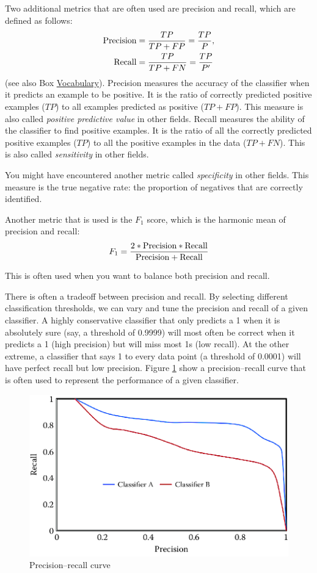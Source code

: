 \documentclass[]{krantz}
\begin{document}
Two additional metrics that are often used are precision and recall,
which are defined as follows: \[\begin{aligned}
{\rm Precision} &= \frac{TP}{TP + FP}=\frac{TP}{P},
\\
{\rm Recall} &= \frac{TP}{TP + FN}=\frac{TP}{P'}
\end{aligned}\] (see also Box \protect\hyperlink{box:ml3}{Vocabulary}).
Precision measures the accuracy of the classifier when it predicts an
example to be positive. It is the ratio of correctly predicted positive
examples (\(TP\)) to all examples predicted as positive (\(TP + FP\)).
This measure is also called \emph{positive predictive value} in other
fields. Recall measures the ability of the classifier to find positive
examples. It is the ratio of all the correctly predicted positive
examples (\(TP\)) to all the positive examples in the data
(\(TP + FN\)). This is also called \emph{sensitivity} in other fields.

You might have encountered another metric called \emph{specificity} in
other fields. This measure is the true negative rate: the proportion of
negatives that are correctly identified.

Another metric that is used is the \(F_1\) score, which is the harmonic
mean of precision and recall:
\[F_1 =  \frac{2* {\rm Precision} * {\rm Recall}}{{\rm Precision} + {\rm Recall}}\]

This is often used when you want to balance both precision and recall.

There is often a tradeoff between precision and recall. By selecting
different classification thresholds, we can vary and tune the precision
and recall of a given classifier. A highly conservative classifier that
only predicts a 1 when it is absolutely sure (say, a threshold of
0.9999) will most often be correct when it predicts a 1 (high precision)
but will miss most 1s (low recall). At the other extreme, a classifier
that says 1 to every data point (a threshold of 0.0001) will have
perfect recall but low precision. Figure \ref{fig:pr} show a
precision--recall curve that is often used to represent the performance
of a given classifier.

\begin{figure}

{\centering \includegraphics[width=0.7\linewidth]{ChapterML/figures/pr} 

}

\caption{Precision--recall curve}\label{fig:pr}
\end{figure}
\end{document}

